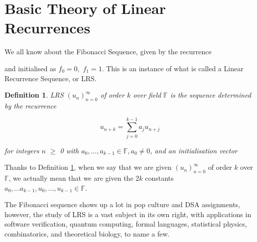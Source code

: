 \documentclass[a4paper,11pt]{article}
\newtheorem{definition}{Definition}
\numberwithin{definition}{section}
\numberwithin{mytheorem}{subsection}
\begin{document}





\date{Autumn 2021}
\maketitle

\justifying
\tableofcontents

\newpage
\justifying
\section{Basic Theory of Linear Recurrences}
We all know about the Fibonacci Sequence, given by the recurrence


and initialised as $f_0 = 0,$ $f_1 = 1$. This is an instance of what is called a Linear Recurrence Sequence, or LRS.

\begin{definition}
\label{Def1.1}
LRS $(u_n)^\infty_{n=0}$ of order $k$ over field $\mathbb{F}$ is the sequence determined by the recurrence

\begin{equation}
\label{eqn:1}
u_{n+k} = \sum\limits_{j=0}^{k-1} a_{j}u_{n+j}
\end{equation}

for integers $n$ $\geq$ \emph{0} with $a_0 , . . . , a_{k−1} \in \mathbb{F}, a_0 \neq 0$, and an initialisation vector

\end{definition}

Thanks to Definition \ref{Def1.1}, when we say that we are given $(u_n)^\infty_{n=0}$
 of order $k$ over $\mathbb{F}$, we actually mean that we are given the 2$k$ constants $a_0 , . . . a_{k−1} , u_0 , . . . , u_{k−1} \in \mathbb{F}$.

The Fibonacci sequence shows up a lot in pop culture and DSA assignments, however, the study of LRS is a vast subject in its own right, with applications in software verification, quantum computing, formal languages, statistical physics, combinatorics, and theoretical biology, to name a few.
\end{document}
